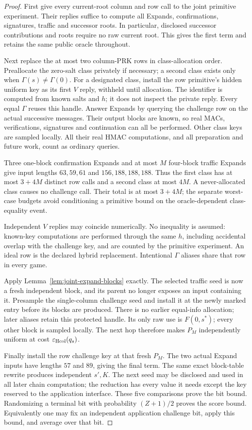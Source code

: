 \begin{proof}
First give every current-root column and row call to the joint primitive
experiment. Their replies suffice to compute all Expands, confirmations,
signatures, traffic and successor roots. In particular, disclosed successor
contributions and roots require no raw current root. This gives the first
term and retains the same public oracle throughout.

Next replace the at most two column-PRK rows in class-allocation order.
Preallocate the zero-salt class privately if necessary; a second class
exists only when $\Gamma(s)\ne\Gamma(0)$. For a designated class, install
the row primitive's hidden uniform key as its first $V$ reply, withheld
until allocation. The identifier is computed from known salts and $h$;
it does not inspect the private reply. Every equal $\Gamma$ reuses this
handle. Answer Expands by querying the challenge row on the actual
successive messages. Their output blocks are known, so real MACs,
verifications, signatures and continuation can all be performed.
Other class keys are sampled locally. All their real HMAC computations,
and all preparation and future work, count as ordinary queries.

Three one-block confirmation Expands and at most $M$ four-block traffic
Expands give input lengths $63,59,61$ and $156,188,188,188$. Thus the
first class has at most $3+4M$ distinct row calls and a second class at most
$4M$. A never-allocated class causes no challenge call. Their total is at
most $3+4M$; the separate worst-case budgets avoid conditioning a
primitive bound on the oracle-dependent class-equality event.

Independent $V$ replies may coincide numerically. No inequality is assumed:
known-key computations are performed through the same $h$, including
accidental overlap with the challenge key, and are counted by the
primitive experiment. An ideal row is the declared hybrid replacement.
Intentional $\Gamma$ aliases share that row in every game.

Apply Lemma~\ref{lem:joint-expand-blocks} exactly. The selected traffic seed
is now a fresh independent block, and its parent no longer exposes an
input containing it. Presample the single-column challenge seed and
install it at the newly marked entry before its blocks are produced.
There is no earlier equal-info allocation; later aliases retain this
protected handle.
Its only raw use is $F(0,s^*)$; every other block is sampled locally.
The next hop therefore makes $P_M$ independently uniform at cost
$\varepsilon_{\rm Hcol}(q_s)$.

Finally install the row challenge key at that fresh $P_M$. The two actual
Expand inputs have lengths $57$ and $89$, giving the final term.
The same exact block-table rewrite produces independent $s',K$.
The next seed may be disclosed and used in all later chain computation;
the reduction has every value it needs except the key reserved to the
application interface. These five comparisons prove the bit bound.
Randomizing a terminal bit with probability $(Z+1)/2$ proves the score
bound. Equivalently one may fix an independent application challenge bit,
apply this bound, and average over that bit.
\end{proof}


